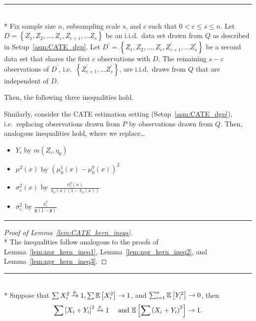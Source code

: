 \hrule

\begin{lem}\label{lem:CATE_kern_ineqs}\mbox{}\\*
	Fix sample size $n$, subsampling scale $s$, and $c$ such that $0 < c \leq s \leq n$.
	Let $D = \left\{Z_1, Z_2, \dotsc, Z_c, Z_{c+1}, \dotsc Z_s \right\}$ be an i.i.d.\ data set drawn from $Q$ as described in Setup~\ref{asm:CATE_dgp}.
	Let $D^{\prime} = \left\{Z_1, Z_2, \dotsc, Z_c, Z_{c+1}^{\prime}, \dotsc Z_s^{\prime} \right\}$ be a second data set that shares the first $c$ observations with $D$.
	The remaining $s - c$ observations of $D^{\prime}$, i.e.\ $\left\{Z_{c+1}^{\prime}, \dotsc Z_s^{\prime} \right\}$, are i.i.d.\ draws from $Q$ that are independent of $D$.

	Then, the following three inequalities hold.

		
	Similarly, consider the CATE estimation setting (Setup~\ref{asm:CATE_dgp}),
	i.e.\ replacing observations drawn from $P$ by observations drawn from $Q$.
	Then, analogous inequalities hold, where we replace\dots
	\begin{multicols}{2}
		\begin{itemize}
			\item $Y_i$ by $m(Z_{i}, \eta_{0})$
			\item $\mu^2(x)$ by $\left(\mu_{0}^{1}\left(x\right) - \mu_{0}^{0}\left(x\right)\right)^2$
			\item $\sigma^{2}_{\varepsilon}(x)$ by $\frac{\sigma_{\varepsilon}^2\left(x\right)}{\pi_{0}(x)\left(1 - \pi_{0}(x)\right)}$
			\item $\overline{\sigma}^{2}_{\varepsilon}$ by $\frac{\overline{\sigma}^2_{\varepsilon}}{\mathfrak{p}\left(1 - \mathfrak{p}\right)}$
		\end{itemize}
	\end{multicols}
\end{lem}

\hrule

\begin{proof}[Proof of Lemma~\ref{lem:CATE_kern_ineqs}]\mbox{}\\*
	The inequalities follow analogous to the proofs of Lemma~\ref{lem:npr_kern_ineq1}, Lemma~\ref{lem:npr_kern_ineq2}, and Lemma~\ref{lem:npr_kern_ineq3}.
\end{proof}

\hrule

\begin{lem}\label{lem:peng1}\mbox{}\\*
	Suppose that $\sum X_{i}^2 \xrightarrow{p} 1, \sum \mathbb{E}\left[X_{i}^2\right] \rightarrow 1$, and $\sum_{i=1}^n \mathbb{E}\left[Y_{i}^2\right] \rightarrow 0$, then
	\begin{equation}
		\sum\left[X_{i}+Y_{i}\right]^2 \xrightarrow{p} 1 \quad \text { and } \mathbb{E}\left[\sum\left(X_{i}+Y_{i}\right)^2\right] \rightarrow 1.
	\end{equation}
\end{lem}

